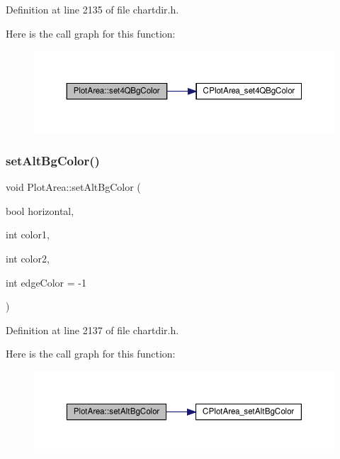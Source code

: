 Definition at line 2135 of file chartdir.\+h.

Here is the call graph for this function\+:
\nopagebreak
\begin{figure}[H]
\begin{center}
\leavevmode
\includegraphics[width=350pt]{class_plot_area_a63d453fecea4dd5f9cfdabf43602d3f8_cgraph}
\end{center}
\end{figure}
\mbox{\label{class_plot_area_ad38abf9c2e982fbf8a19f32204d19b67}} 
\subsubsection{\texorpdfstring{set\+Alt\+Bg\+Color()}{setAltBgColor()}}
{\footnotesize\ttfamily void Plot\+Area\+::set\+Alt\+Bg\+Color (\begin{DoxyParamCaption}\item[{bool}]{horizontal,  }\item[{int}]{color1,  }\item[{int}]{color2,  }\item[{int}]{edge\+Color = {\ttfamily -\/1} }\end{DoxyParamCaption})\hspace{0.3cm}{\ttfamily [inline]}}



Definition at line 2137 of file chartdir.\+h.

Here is the call graph for this function\+:
\nopagebreak
\begin{figure}[H]
\begin{center}
\leavevmode
\includegraphics[width=350pt]{class_plot_area_ad38abf9c2e982fbf8a19f32204d19b67_cgraph}
\end{center}
\end{figure}
\mbox{\label{class_plot_area_a04f56242f125bf96a1c6e8dc0ce74342}} 
